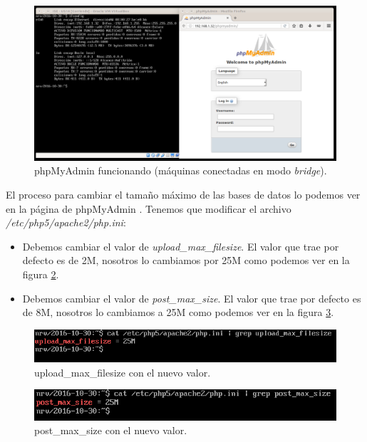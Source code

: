 \documentclass[a4paper,titlepage,12pt]{scrartcl}	%
\numberwithin{figure}{section} %
\numberwithin{table}{section} %
\begin{document}
	\begin{figure}[H]
		\includegraphics[width=\linewidth]{./Imagenes/13-phpmyadminfuncionando.png}
		\vspace{-0.5cm}
		\caption[phpMyAdmin funcionando (máquinas conectadas en modo \textit{bridge}).]{phpMyAdmin funcionando (máquinas conectadas en modo \textit{bridge}).}
		\label{13-phpmyadminfuncionando}
	\end{figure}
	
	El proceso para cambiar el tamaño máximo de las bases de datos lo podemos ver en la página de phpMyAdmin \cite{phpmyadfilesize}. Tenemos que modificar el archivo \textit{/etc/php5/apache2/php.ini}:
	\begin{itemize}
		\item Debemos cambiar el valor de \textit{upload\_max\_filesize}. El valor que trae por defecto es de 2M, nosotros lo cambiamos por 25M como podemos ver en la figura \ref{13-upload_max_filesize}.
		\item Debemos cambiar el valor de \textit{post\_max\_size}. El valor que trae por defecto es de 8M, nosotros lo cambiamos a 25M como podemos ver en la figura \ref{13-post_max_size}.
	\end{itemize}
	
	\begin{figure}[H]
		\includegraphics[width=\linewidth]{./Imagenes/13-upload_max_filesize.png}
		\vspace{-0.5cm}
		\caption[upload\_max\_filesize con el nuevo valor.]{upload\_max\_filesize con el nuevo valor.}
		\label{13-upload_max_filesize}
	\end{figure}
	
	\begin{figure}[H]
		\includegraphics[width=\linewidth]{./Imagenes/13-post_max_size.png}
		\vspace{-0.5cm}
		\caption[post\_max\_size con el nuevo valor.]{post\_max\_size con el nuevo valor.}
		\label{13-post_max_size}
	\end{figure}
	
\end{document}
